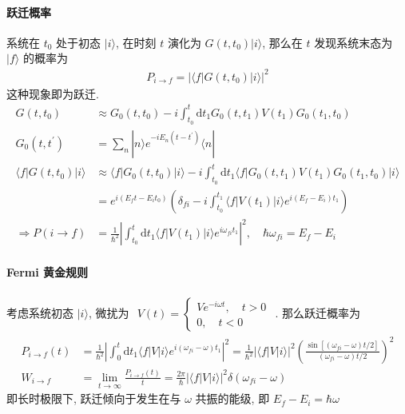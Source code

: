 \documentclass[../../main.tex]{subfiles}
\begin{document}
\paragraph{跃迁概率}
系统在 $t_{0}$ 处于初态 $|i\rangle$, 在时刻 $t$ 演化为 $G(t,t_{0})|i\rangle$, 那么在 $t$ 发现系统末态为 $|f\rangle$ 的概率为
\begin{align*}
    P_{i\rightarrow f} = |\langle f|G(t,t_{0})|i\rangle|^{2}
\end{align*}
这种现象即为跃迁. 
\begin{align*}
    G(t,t_{0}) &\approx G_{0}(t,t_{0}) - i\int_{t_{0}}^{t}\mathrm{d}t_{1}G_{0}(t,t_{1})V(t_{1})G_{0}(t_{1},t_{0})\\
    G_{0}(t,t^{\prime}) &= \sum_{n}|n\rangle e^{-iE_{n}(t-t^{\prime})}\langle n|\\
    \langle f|G(t,t_{0})|i\rangle &\approx \langle f|G_{0}(t,t_{0})|i\rangle -i\int_{t_{0}}^{t}\mathrm{d}t_{1}\langle f|G_{0}(t,t_{1})V(t_{1})G_{0}(t_{1},t_{0})|i\rangle\\
    &= e^{i(E_{f}t-E_{i}t_{0})}\left(\delta_{fi} - i\int_{t_{0}}^{t_{1}}\langle f|V(t_{1})|i\rangle e^{i(E_{f}-E_{i})t_{1}}\right)\\
    \Rightarrow P(i\rightarrow f) &= \frac{1}{\hbar^{2}}\left|\int_{t_{0}}^{t}\mathrm{d}t_{1}\langle f|V(t_{1})|i\rangle e^{i\omega_{fi}t_{1}}\right|^{2},\quad \hbar\omega_{fi} = E_{f}-E_{i}
\end{align*}
\paragraph{Fermi 黄金规则}
考虑系统初态 $|i\rangle$, 微扰为 $\begin{aligned}
    V(t) = \left\{\begin{aligned}
        Ve^{-i\omega t},\quad t > 0\\
        0,\quad t < 0
    \end{aligned}\right.
\end{aligned}$. 那么跃迁概率为
\begin{align*}
    P_{i\rightarrow f}(t) &= \frac{1}{\hbar^{2}}\left|\int_{0}^{t}\mathrm{d}t_{1}\langle f|V|i\rangle e^{i(\omega_{fi}-\omega)t_{1}}\right|^{2} = \frac{1}{\hbar^{2}}|\langle f|V|i\rangle|^{2}\left(\frac{\sin{[(\omega_{fi}-\omega)t/2]}}{(\omega_{fi}-\omega)t/2}\right)^{2}\\
    W_{i\rightarrow f} &= \lim_{t\rightarrow \infty}\frac{P_{i\rightarrow f}(t)}{t} = \frac{2\pi}{\hbar}|\langle f|V|i\rangle|^{2}\delta(\omega_{fi}-\omega)
\end{align*}
即长时极限下, 跃迁倾向于发生在与 $\omega$ 共振的能级, 即 $E_{f}-E_{i} = \hbar\omega$
\end{document}
